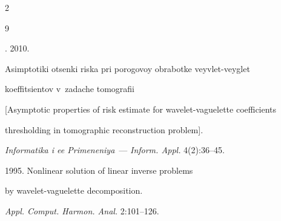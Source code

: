   \begin{multicols}{2}





\renewcommand{\bibname}{\protect\rmfamily References}













{\small\frenchspacing


 { %




 \begin{thebibliography}{9}













. 2010.


Asimptotiki otsen\-ki riska pri porogovoy obrabotke veyvlet-veyglet


koeffitsientov v~zadache tomografii


[Asymptotic properties of risk estimate for wavelet-vaguelette coefficients


thresholding in  tomographic reconstruction problem].


\textit{Informatika i ee Primeneniya}~--- \textit{Inform. Appl.} 4(2):36--45.












 1995. Nonlinear solution of linear inverse problems


by wavelet-vaguelette decomposition.


\textit{Appl. Comput. Harmon. Anal.}  2:101--126.











\end{thebibliography}}}
\end{multicols}
